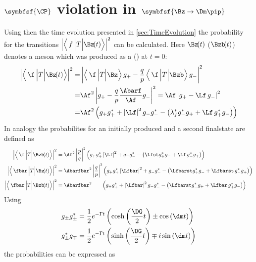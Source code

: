 \Blindtext

\section[head={\CP violation in $\Bz\to\Dm\pip$},tocentry={\CP violation in $\Bz\to\Dm\pip$}]{$\symbfsf{\CP}$ violation in $\symbfsf{\Bz\to\Dm\pip}$}
\label{sec:cpvInBd2Dpi}

Using then the time evolution presented in \cref{sec:TimeEvolution} the probability for the transitions $\left|\left<\,f\,\Big|T\Big|\Bz\!(t)\right>\right|^2$ can be calculated.
Here $\Bz\!(t)$ ($\Bzb\!(t)$) denotes a \B meson which was produced as a \Bz (\Bzb) at $t=0$:
\begin{align}
\left|\left<\,\f\,\Big|T\Big|\Bz\!(t)\right>\right|^2 =&
\left|\left<\,\f\,\Big|T\Big|\Bz\right>g_+-\frac{q}{p}\left<\,\f\,\Big|T\Big|\Bzb\right>g_-\right|^2\nonumber\\
=&\Af^2\left|g_+ - \frac{q}{p}\frac{\Abarf}{\Af} g_-\right|^2=\Af\left|g_+ -\Lf\,g_-\right|^2\nonumber\\
=&\Af^2\left(g_+g_+^*+\left|\Lf\right|^2g_-g_-^*-\left(\lambda_{f}^*g_-^*g_+ + \Lf\,g_+^* g_-\right)\right)
\end{align}
In analogy the probabilites for an initially produced \Bzb and a second finalstate \fbar are defined as
\begin{align}
\left|\left<\,\f\,\Big|T\Big|\Bzb\!(t)\right>\right|^2 &=
\Af^2\left|\frac{p}{q}\right|^2\left(g_+g_+^*\left|\Lf\right|^2+g_-g_-^*-\left(\Lfst g_+^*g_- + \Lf\,g_-^* g_+\right)\right)\\
\left|\left<\,\fbar\,\Big|T\Big|\Bz\!(t)\right>\right|^2 &=
\Abarfbar^2\left|\frac{q}{p}\right|^2\left(g_+g_+^*\left|\Lfbar\right|^2+g_-g_-^*-\left(\Lfbarst g_+^*g_- + \Lfbarst\,g_-^* g_+\right)\right)\\
\left|\left<\,\fbar\,\Big|T\Big|\Bzb\!(t)\right>\right|^2 &=
\Abarfbar^2\hphantom{\left|\frac{q}{p}\right|^2}\left(g_+g_+^*+\left|\Lfbar\right|^2g_-g_-^*-\left(\Lfbarst g_-^*g_+ + \Lfbar\,g_+^* g_-\right)\right)
\end{align}
Using
\begin{align}
g_{\pm}g_{\pm}^{*} &= \frac{1}{2}e^{-\Gamma t}\left(\cosh\left(\frac{\DG}{2}t\right)\pm\cos\left(\dm t\right)\right)\\
g_{\pm}^*g_{\mp} &=  \frac{1}{2}e^{-\Gamma t}\left(\sinh\left(\frac{\DG}{2}t\right)\mp i\sin\left(\dm t\right)\right)
\end{align}
the probabilities can be expressed as
